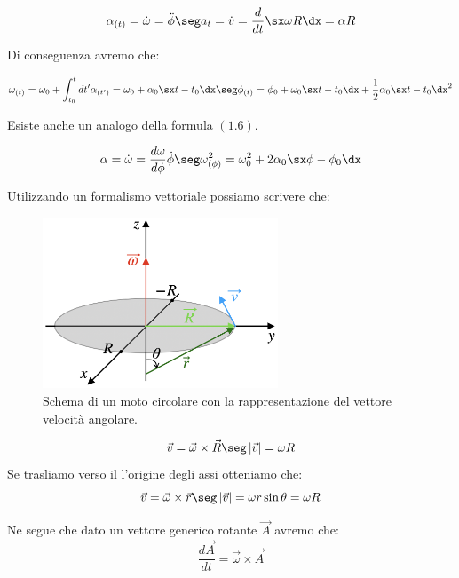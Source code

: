 \begin{equation}
\alpha_{(t)} = \dot \omega = \ddot \phi\seg a_t = \dot v = \frac d{dt}\sx \omega R\dx = \alpha R
\end{equation}

Di conseguenza avremo che:

\begin{equation}
\omega_{(t)} = \omega_0 + \int_{t_0}^tdt'\alpha_{(t')}  = \omega_0 + \alpha_0\sx t - t_0\dx \seg
\phi_{(t)} = \phi_0 + \omega_0\sx t - t_0\dx+ \frac12\alpha_0\sx t - t_0\dx^2
\end{equation}


Esiste anche un analogo della formula $(1.6)$.

\begin{equation}
\alpha =\dot \omega = \frac{d\omega}{d\phi}\dot\phi\seg \omega^2_{(\phi)} = \omega_0^2 + 2\alpha_0\sx\phi-\phi_0\dx
\end{equation}

Utilizzando un formalismo vettoriale possiamo scrivere che:
\begin{figure}[htbp]
\centering
\includegraphics[width=7cm]{images/ovetr.png}
\caption{Schema di un moto circolare con la rappresentazione del vettore velocità angolare.}
\label{etichetta1}
\end{figure}

\begin{equation}
\vec v = \vec\omega\times\vec R\seg \left| \vec v \right|  = \omega R
\end{equation}
Se trasliamo verso il l'origine degli assi otteniamo che:
\begin{equation}
\vec v = \vec\omega\times\vec r\seg \left| \vec v \right|  = \omega r\sin\theta = \omega R
\end{equation}

Ne segue che dato un vettore generico rotante $\vec A$ avremo che:
\begin{equation}
\frac{d\vec A}{dt} = \vec\omega\times\vec A
\end{equation}

